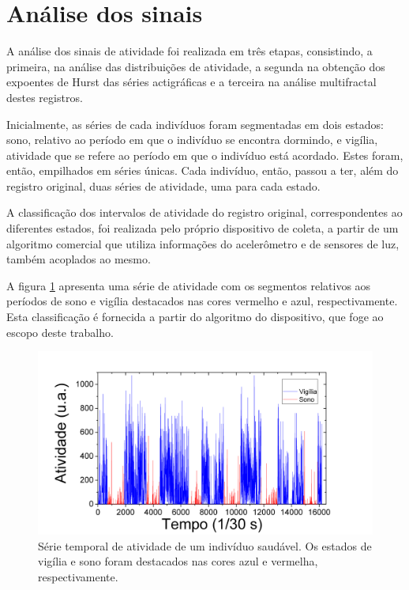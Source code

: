 \documentclass{ufscThesis}
\begin{document}
\section{Análise dos sinais}

A análise dos sinais de atividade foi realizada em três etapas, consistindo, a primeira, na análise das distribuições de atividade, a segunda na obtenção dos expoentes de Hurst das séries actigráficas e a terceira na análise multifractal destes registros.\par
Inicialmente, as séries de cada indivíduos foram segmentadas em dois estados: sono, relativo ao período em que o indivíduo se encontra dormindo, e vigília, atividade que se refere ao período em que o indivíduo está acordado. Estes foram, então, empilhados em séries únicas. Cada indivíduo, então, passou a ter, além do registro original, duas séries de atividade, uma para cada estado.\par
A classificação dos intervalos de atividade do registro original, correspondentes ao diferentes estados, foi realizada pelo próprio dispositivo de coleta, a partir de um algoritmo comercial que utiliza informações do acelerômetro e de sensores de luz, também acoplados ao mesmo.\par
A figura \ref{colorstates} apresenta uma série de atividade com os segmentos relativos aos períodos de sono e vigília destacados nas cores vermelho e azul, respectivamente. Esta classificação é fornecida a partir do algoritmo do dispositivo, que foge ao escopo deste trabalho.

\begin{figure}[!h]
\centering
\includegraphics[scale=0.25]{colorstates.png}
\caption{Série temporal de atividade de um indivíduo saudável. Os estados de vigília e sono foram destacados nas cores azul e vermelha, respectivamente.}
\label{colorstates}
\end{figure}
 
\end{document}
